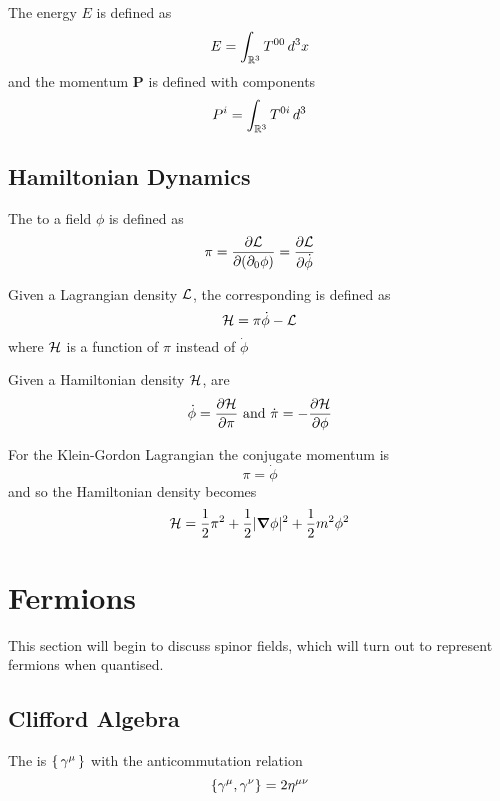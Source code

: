 \documentclass{article}
\begin{document}
\begin{definition}
The energy $E$ is defined as 
\[
E=\int_{\mbb{R}^3} T^{00} \, d^3x
\]
and the momentum $\bm{P}$ is defined with components 
\[
P^i = \int_{\mbb{R}^3} T^{0i} \, d^3
\]

\end{definition}

\subsection{Hamiltonian Dynamics}

\begin{definition}
The  to a field $\phi$ is defined as 
\[
\pi = \pd[\mc{L}]{(\del_0\phi)} = \pd[\mc{L}]{\dot{\phi}}
\]
\end{definition}

\begin{definition}
Given a Lagrangian density $\mc{L}$, the corresponding  is defined as 
\[
\mc{H}=\pi \dot{\phi}-\mc{L}
\]
where $\mc{H}$ is a function of $\pi$ instead of $\dot{\phi}$
\end{definition}

\begin{definition}
Given a Hamiltonian density $\mc{H}$,  are 
\[
\dot{\phi}=\pd[\mc{H}]{\pi} \text{ and } \dot{\pi}=-\pd[\mc{H}]{\phi} 
\]
\end{definition}

\begin{example}
For the Klein-Gordon Lagrangian the conjugate momentum is 
\[
\pi=\dot{\phi}
\]
and so the Hamiltonian density becomes 
\[
\mc{H}=\frac{1}{2}\pi^2+\frac{1}{2}|\grad\phi|^2+\frac{1}{2}m^2\phi^2
\]
\end{example}

\section{Fermions}
This section will begin to discuss spinor fields, which will turn out to represent fermions when quantised.
\subsection{Clifford Algebra}
The  is $\set{ \gamma^\mu }$ with the anticommutation relation 
\[
\acomm[\gamma^\mu]{\gamma^\nu} = 2\eta^{\mu\nu}
\]
\end{document}
